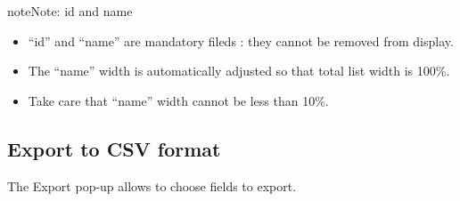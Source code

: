 \documentclass[letterpaper,10pt,english]{sphinxmanual}
\begin{document}
\begin{notice}{note}{Note:}
id and name
\begin{itemize}
\item {} 
“id” and “name” are mandatory fileds : they cannot be removed from display.

\item {} 
The “name” width is automatically adjusted so that total list width is 100\%.

\item {} 
Take care that “name” width cannot be less than 10\%.

\end{itemize}
\end{notice}
\begin{figure}[htbp]
\centering

\end{figure}
\newpage

\subsection{Export to CSV format}
\label{Gui:export-to-csv-format}\label{Gui:gui-exportcsv-format-label}
The Export pop-up allows to choose fields to export.
\end{document}
